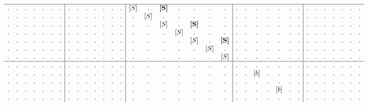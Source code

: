 \begin{example}
\begin{align}
\begin{array}{c c c c c c c | c c c c c c c | c c c c c c c | c c c c c c c | c c c c c c c}
\hline
. & . & . & . & . & . & .  &  . & . & . & . & . & . & .  &  [S] & .   & \textbf{[S]} & .   & .            & .   & .             &  . & . & . & . & . & . & .  &  . & . & . & . & . & . & .   \\
. & . & . & . & . & . & .  &  . & . & . & . & . & . & .  &  .   & [S] & .            & .   & .            & .   & .             &  . & . & . & . & . & . & .  &  . & . & . & . & . & . & .   \\
. & . & . & . & . & . & .  &  . & . & . & . & . & . & .  &  .   & .   & [S]          & .   & \textbf{[S]} & .   & .             &  . & . & . & . & . & . & .  &  . & . & . & . & . & . & .   \\
. & . & . & . & . & . & .  &  . & . & . & . & . & . & .  &  .   & .   & .            & [S] & .            & .   & .             &  . & . & . & . & . & . & .  &  . & . & . & . & . & . & .   \\
. & . & . & . & . & . & .  &  . & . & . & . & . & . & .  &  .   & .   & .            & .   & [S]          & .   & \textbf{[S]}  &  . & . & . & . & . & . & .  &  . & . & . & . & . & . & .   \\
. & . & . & . & . & . & .  &  . & . & . & . & . & . & .  &  .   & .   & .            & .   & .            & [S] & .             &  . & . & . & . & . & . & .  &  . & . & . & . & . & . & .   \\
. & . & . & . & . & . & .  &  . & . & . & . & . & . & .  &  .   & .   & .            & .   & .            & .   & [S]           &  . & . & . & . & . & . & .  &  . & . & . & . & . & . & .   \\
\hline
. & . & . & . & . & . & .  &  . & . & . & . & . & . & .  &  . & . & . & . & . & . & .  &  . & . & .   & . & .   & . & .    &  . & . & . & . & . & . & .   \\
. & . & . & . & . & . & .  &  . & . & . & . & . & . & .  &  . & . & . & . & . & . & .  &  . & . & [b] & . & .   & . & .    &  . & . & . & . & . & . & .   \\
. & . & . & . & . & . & .  &  . & . & . & . & . & . & .  &  . & . & . & . & . & . & .  &  . & . & .   & . & .   & . & .    &  . & . & . & . & . & . & .   \\
. & . & . & . & . & . & .  &  . & . & . & . & . & . & .  &  . & . & . & . & . & . & .  &  . & . & .   & . & [b] & . & .    &  . & . & . & . & . & . & .   \\
. & . & . & . & . & . & .  &  . & . & . & . & . & . & .  &  . & . & . & . & . & . & .  &  . & . & .   & . & .   & . & .    &  . & . & . & . & . & . & .   \\

\end{array}
\end{align}
\end{example}
